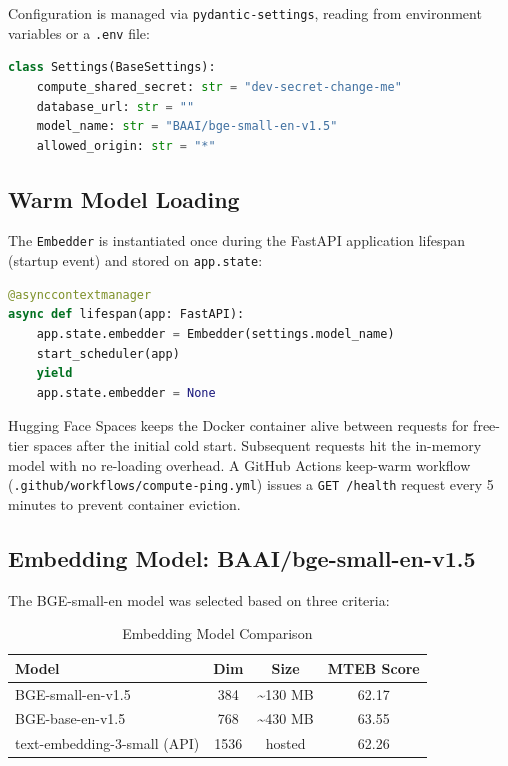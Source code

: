 \documentclass[conference]{IEEEtran}
\begin{document}
Configuration is managed via \texttt{pydantic-settings}, reading from
environment variables or a \texttt{.env} file:

\begin{lstlisting}[language=Python, caption={Compute service settings.}]
class Settings(BaseSettings):
    compute_shared_secret: str = "dev-secret-change-me"
    database_url: str = ""
    model_name: str = "BAAI/bge-small-en-v1.5"
    allowed_origin: str = "*"
\end{lstlisting}

\subsection{Warm Model Loading}

The \texttt{Embedder} is instantiated once during the FastAPI application
lifespan (startup event) and stored on \texttt{app.state}:

\begin{lstlisting}[language=Python, caption={Lifespan warm-up.}]
@asynccontextmanager
async def lifespan(app: FastAPI):
    app.state.embedder = Embedder(settings.model_name)
    start_scheduler(app)
    yield
    app.state.embedder = None
\end{lstlisting}

Hugging Face Spaces keeps the Docker container alive between requests for
free-tier spaces after the initial cold start. Subsequent requests hit the
in-memory model with no re-loading overhead. A GitHub Actions keep-warm
workflow (\texttt{.github/workflows/compute-ping.yml}) issues a
\texttt{GET /health} request every 5 minutes to prevent container eviction.

\subsection{Embedding Model: BAAI/bge-small-en-v1.5}

The BGE-small-en model was selected based on three criteria:

\begin{table}[htbp]
\caption{Embedding Model Comparison}
\label{tab:models_embed}
\centering
\begin{tabular}{lccc}
\toprule
\textbf{Model} & \textbf{Dim} & \textbf{Size} & \textbf{MTEB Score} \\
\midrule
BGE-small-en-v1.5   & 384  & \textasciitilde130 MB & 62.17 \\
BGE-base-en-v1.5    & 768  & \textasciitilde430 MB & 63.55 \\
text-embedding-3-small (API) & 1536 & hosted & 62.26 \\
\bottomrule
\end{tabular}
\end{table}
\end{document}
